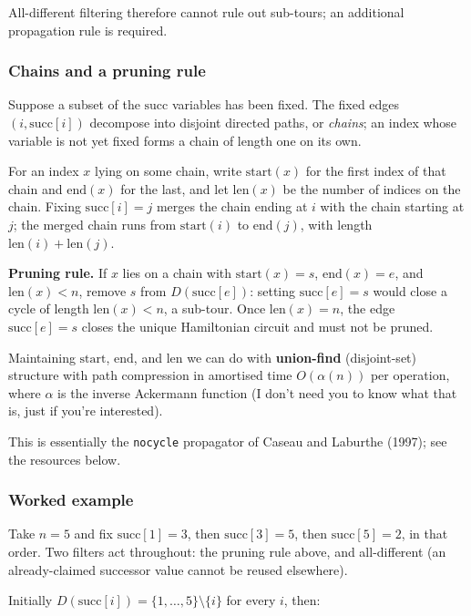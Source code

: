 \documentclass[11pt]{article}
\begin{document}
All-different filtering therefore cannot rule out sub-tours; an additional propagation rule is required.

\subsubsection{Chains and a pruning rule}

Suppose a subset of the $\text{succ}$ variables has been fixed. The fixed edges $(i,\text{succ}[i])$ decompose into disjoint directed paths, or \emph{chains}; an index whose variable is not yet fixed forms a chain of length one on its own.

For an index $x$ lying on some chain, write $\text{start}(x)$ for the first index of that chain and $\text{end}(x)$ for the last, and let $\text{len}(x)$ be the number of indices on the chain. Fixing $\text{succ}[i]=j$ merges the chain ending at $i$ with the chain starting at $j$; the merged chain runs from $\text{start}(i)$ to $\text{end}(j)$, with length $\text{len}(i)+\text{len}(j)$.

\textbf{Pruning rule.} If $x$ lies on a chain with $\text{start}(x)=s$, $\text{end}(x)=e$, and $\text{len}(x) < n$, remove $s$ from $D(\text{succ}[e])$: setting $\text{succ}[e]=s$ would close a cycle of length $\text{len}(x) < n$, a sub-tour. Once $\text{len}(x)=n$, the edge $\text{succ}[e]=s$ closes the unique Hamiltonian circuit and must not be pruned.

Maintaining $\text{start}$, $\text{end}$, and $\text{len}$ we can do with \textbf{union-find} (disjoint-set) structure with path compression in amortised time $O(\alpha(n))$ per operation, where $\alpha$ is the inverse Ackermann function (I don't need you to know what that is, just if you're interested).

This is essentially the \texttt{nocycle} propagator of Caseau and Laburthe (1997); see the resources below.

\subsubsection{Worked example}

Take $n=5$ and fix $\text{succ}[1]=3$, then $\text{succ}[3]=5$, then $\text{succ}[5]=2$, in that order. Two filters act throughout: the pruning rule above, and all-different (an already-claimed successor value cannot be reused elsewhere).

Initially $D(\text{succ}[i]) = \{1,\dots,5\}\setminus\{i\}$ for every $i$, then:
\end{document}
